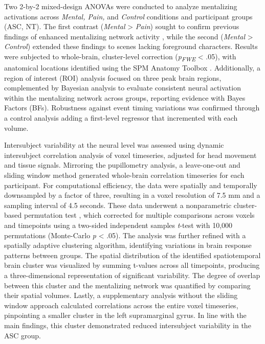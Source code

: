Two 2-by-2 mixed-design ANOVAs were conducted to analyze mentalizing activations across \textit{Mental, Pain,} and \textit{Control} conditions and participant groups (ASC, NT). The first contrast (\textit{Mental} > \textit{Pain}) sought to confirm previous findings of enhanced mentalizing network activity \citep{jacoby2016}, while the second (\textit{Mental} > \textit{Control}) extended these findings to scenes lacking foreground characters. Results were subjected to whole-brain, cluster-level correction (\textit{p\textsubscript{FWE}} < .05), with anatomical locations identified using the SPM Anatomy Toolbox \citep{eickhoff2005}. Additionally, a region of interest (ROI) analysis focused on three peak brain regions, complemented by Bayesian analysis \citep{jasp2022} to evaluate consistent neural activation within the mentalizing network across groups, reporting evidence with Bayes Factors (BFs). Robustness against event timing variations was confirmed through a control analysis adding a first-level regressor that incremented with each volume.

Intersubject variability at the neural level was assessed using dynamic intersubject correlation analysis of voxel timeseries, adjusted for head movement and tissue signals. Mirroring the pupillometry analysis, a leave-one-out and sliding window method generated whole-brain correlation timeseries for each participant. For computational efficiency, the data were spatially and temporally downsampled by a factor of three, resulting in a voxel resolution of 7.5 mm and a sampling interval of 4.5 seconds. These data underwent a nonparametric cluster-based permutation test \citep{maris2007}, which corrected for multiple comparisons across voxels and timepoints using a two-sided independent samples \textit{t}-test with 10,000 permutations (Monte-Carlo \textit{p} < .05). The analysis was further refined with a spatially adaptive clustering algorithm, identifying variations in brain response patterns between groups. The spatial distribution of the identified spatiotemporal brain cluster was visualized by summing t-values across all timepoints, producing a three-dimensional representation of significant variability. The degree of overlap between this cluster and the mentalizing network was quantified by comparing their spatial volumes. Lastly, a supplementary analysis without the sliding window approach calculated correlations across the entire voxel timeseries, pinpointing a smaller cluster in the left supramarginal gyrus. In line with the main findings, this cluster demonstrated reduced intersubject variability in the ASC group.

